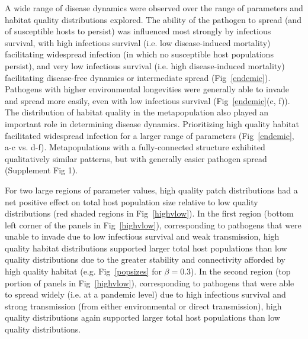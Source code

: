\documentclass{article}
\begin{document}
A wide range of disease dynamics were observed over the range of parameters and habitat quality distributions explored.  
The ability of the pathogen to spread (and of susceptible hosts to persist) was influenced most strongly by infectious survival, with high infectious survival (i.e. low disease-induced mortality) facilitating widespread infection (in which no susceptible host populations persist), and very low infectious survival (i.e. high disease-induced mortality) facilitating disease-free dynamics or intermediate spread (Fig~\ref{endemic}). 
Pathogens with higher environmental longevities were generally able to invade and spread more easily, even with low infectious survival (Fig~\ref{endemic}(c, f)).  
The distribution of habitat quality in the metapopulation also played an important role in determining disease dynamics.  Prioritizing high quality habitat facilitated widespread infection for a larger range of parameters (Fig~\ref{endemic}, a-c vs. d-f).
Metapopulations with a fully-connected structure exhibited qualitatively similar patterns, but with generally easier pathogen spread (Supplement Fig 1).

For two large regions of parameter values, high quality patch distributions had a net positive effect on total host population size relative to low quality distributions (red shaded regions in Fig~\ref{highvlow}).  
In the first region (bottom left corner of the panels in Fig~\ref{highvlow}), corresponding to pathogens that were unable to invade due to low infectious survival and weak transmission, high quality habitat distributions supported larger total host populations than low quality distributions due to the greater stability and connectivity afforded by high quality habitat (e.g. Fig~\ref{popsizes} for $\beta = 0.3$). 
In the second region (top portion of panels in Fig~\ref{highvlow}), corresponding to pathogens that were able to spread widely (i.e. at a pandemic level) due to high infectious survival and strong transmission (from either environmental or direct transmission), high quality distributions again supported larger total host populations than low quality distributions.
\end{document}
